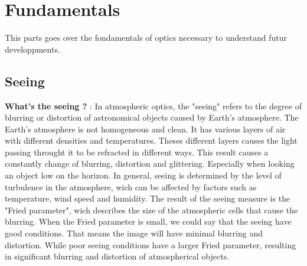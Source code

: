 \section{Fundamentals}
This parts goes over the fondamentals of optics necessary to understand futur developpments.
\subsection{Seeing}
\textbf{What's the seeing ?} : \newline In atmospheric optics, the "seeing" refers to the degree of blurring or distortion of astronomical objects 
caused by Earth's atmosphere. The Earth's atmosphere is not homogeneous and clean. It has various layers of air with different densities and temperatures.
Theses different layers causes the light passing throught it to be refracted in different ways. This result causes a constantly change of blurring, 
distortion and glittering. Especially when looking an object low on the horizon. \newline
In general, seeing is determined by the level of turbulence in the atmosphere, wich can be affected by factors such as temperature, wind speed and 
humidity. The result of the seeing measure is the "Fried parameter", wich describes the size of the atmospheric cells that cause the blurring. 
When the Fried parameter is small, we could say that the seeing have good conditions. That means the image will have minimal blurring and distortion. 
While poor seeing conditions have a larger Fried parameter, resulting in significant blurring and distortion of atmospherical objects.

